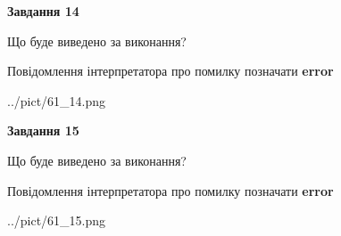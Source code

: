 \documentclass[11pt, ukrainian]{article}
\begin{document}
{\begin {large}
{\begin {center}\textbf{Завдання 14}\end {center}}\par
Що буде виведено за виконання? \par
Повідомлення інтерпретатора про помилку позначати \textbf{error}

\begin{center}
	{../pict/61_14.png}
\end{center}
\newpage

{\begin {center}\textbf{Завдання 15}\end {center}}\par
Що буде виведено за виконання? \par
Повідомлення інтерпретатора про помилку позначати \textbf{error}

\begin{center}
	{../pict/61_15.png}
\end{center}
\newpage

\end {large}}
\end{document}
